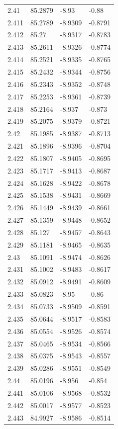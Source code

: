 \begin{tabular}{llll}
2.41 & 85.2879 & -8.93 & -0.88 \\
2.411 & 85.2789 & -8.9309 & -0.8791 \\
2.412 & 85.27 & -8.9317 & -0.8783 \\
2.413 & 85.2611 & -8.9326 & -0.8774 \\
2.414 & 85.2521 & -8.9335 & -0.8765 \\
2.415 & 85.2432 & -8.9344 & -0.8756 \\
2.416 & 85.2343 & -8.9352 & -0.8748 \\
2.417 & 85.2253 & -8.9361 & -0.8739 \\
2.418 & 85.2164 & -8.937 & -0.873 \\
2.419 & 85.2075 & -8.9379 & -0.8721 \\
2.42 & 85.1985 & -8.9387 & -0.8713 \\
2.421 & 85.1896 & -8.9396 & -0.8704 \\
2.422 & 85.1807 & -8.9405 & -0.8695 \\
2.423 & 85.1717 & -8.9413 & -0.8687 \\
2.424 & 85.1628 & -8.9422 & -0.8678 \\
2.425 & 85.1538 & -8.9431 & -0.8669 \\
2.426 & 85.1449 & -8.9439 & -0.8661 \\
2.427 & 85.1359 & -8.9448 & -0.8652 \\
2.428 & 85.127 & -8.9457 & -0.8643 \\
2.429 & 85.1181 & -8.9465 & -0.8635 \\
2.43 & 85.1091 & -8.9474 & -0.8626 \\
2.431 & 85.1002 & -8.9483 & -0.8617 \\
2.432 & 85.0912 & -8.9491 & -0.8609 \\
2.433 & 85.0823 & -8.95 & -0.86 \\
2.434 & 85.0733 & -8.9509 & -0.8591 \\
2.435 & 85.0644 & -8.9517 & -0.8583 \\
2.436 & 85.0554 & -8.9526 & -0.8574 \\
2.437 & 85.0465 & -8.9534 & -0.8566 \\
2.438 & 85.0375 & -8.9543 & -0.8557 \\
2.439 & 85.0286 & -8.9551 & -0.8549 \\
2.44 & 85.0196 & -8.956 & -0.854 \\
2.441 & 85.0106 & -8.9568 & -0.8532 \\
2.442 & 85.0017 & -8.9577 & -0.8523 \\
2.443 & 84.9927 & -8.9586 & -0.8514 \\

\end{tabular}
